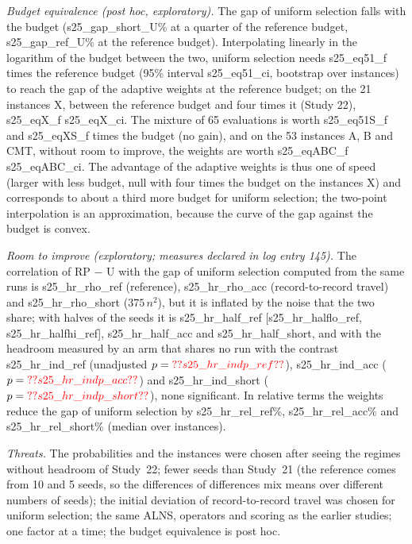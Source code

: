 \emph{Budget equivalence (post hoc, exploratory).} The gap of uniform selection falls with the budget (\num{s25_gap_short_U}\% at a quarter of the reference budget, \num{s25_gap_ref_U}\% at the reference budget). Interpolating linearly in the logarithm of the budget between the two, uniform selection needs \num{s25_eq51_f} times the reference budget (95\% interval \num{s25_eq51_ci}, bootstrap over instances) to reach the gap of the adaptive weights at the reference budget; on the 21 instances X, between the reference budget and four times it (Study 22), \num{s25_eqX_f} \num{s25_eqX_ci}. The mixture of 65 evaluations is worth \num{s25_eq51S_f} and \num{s25_eqXS_f} times the budget (no gain), and on the 53 instances A, B and CMT, without room to improve, the weights are worth \num{s25_eqABC_f} \num{s25_eqABC_ci}. The advantage of the adaptive weights is thus one of speed (larger with less budget, null with four times the budget on the instances X) and corresponds to about a third more budget for uniform selection; the two-point interpolation is an approximation, because the curve of the gap against the budget is convex.

\emph{Room to improve (exploratory; measures declared in log entry 145).} The correlation of RP $-$ U with the gap of uniform selection computed from the same runs is \num{s25_hr_rho_ref} (reference), \num{s25_hr_rho_acc} (record-to-record travel) and \num{s25_hr_rho_short} ($375\,n^2$), but it is inflated by the noise that the two share; with halves of the seeds it is \num{s25_hr_half_ref} [\num{s25_hr_halflo_ref}, \num{s25_hr_halfhi_ref}], \num{s25_hr_half_acc} and \num{s25_hr_half_short}, and with the headroom measured by an arm that shares no run with the contrast \num{s25_hr_ind_ref} (unadjusted $p=\num{s25_hr_indp_ref}$), \num{s25_hr_ind_acc} ($p=\num{s25_hr_indp_acc}$) and \num{s25_hr_ind_short} ($p=\num{s25_hr_indp_short}$), none significant. In relative terms the weights reduce the gap of uniform selection by \num{s25_hr_rel_ref}\%, \num{s25_hr_rel_acc}\% and \num{s25_hr_rel_short}\% (median over instances).

\emph{Threats.} The probabilities and the instances were chosen after seeing the regimes without headroom of Study~22; fewer seeds than Study~21 (the reference comes from 10 and 5 seeds, so the differences of differences mix means over different numbers of seeds); the initial deviation of record-to-record travel was chosen for uniform selection; the same ALNS, operators and scoring as the earlier studies; one factor at a time; the budget equivalence is post hoc.

